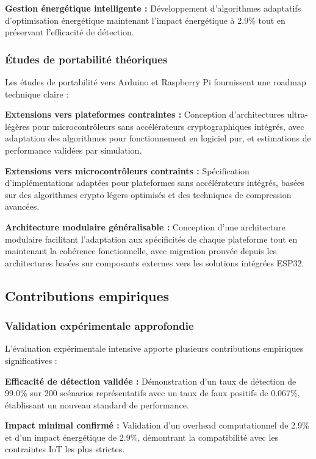 \textbf{Gestion énergétique intelligente :} Développement d'algorithmes adaptatifs d'optimisation énergétique maintenant l'impact énergétique à 2.9\% tout en préservant l'efficacité de détection.

\subsubsection{Études de portabilité théoriques}

Les études de portabilité vers Arduino et Raspberry Pi fournissent une roadmap technique claire :

\textbf{Extensions vers plateformes contraintes :} Conception d'architectures ultra-légères pour microcontrôleurs sans accélérateurs cryptographiques intégrés, avec adaptation des algorithmes pour fonctionnement en logiciel pur, et estimations de performance validées par simulation.

\textbf{Extensions vers microcontrôleurs contraints :} Spécification d'implémentations adaptées pour plateformes sans accélérateurs intégrés, basées sur des algorithmes crypto légers optimisés et des techniques de compression avancées.

\textbf{Architecture modulaire généralisable :} Conception d'une architecture modulaire facilitant l'adaptation aux spécificités de chaque plateforme tout en maintenant la cohérence fonctionnelle, avec migration prouvée depuis les architectures basées sur composants externes vers les solutions intégrées ESP32.

\subsection{Contributions empiriques}

\subsubsection{Validation expérimentale approfondie}

L'évaluation expérimentale intensive apporte plusieurs contributions empiriques significatives :

\textbf{Efficacité de détection validée :} Démonstration d'un taux de détection de 99.0\% sur 200 scénarios représentatifs avec un taux de faux positifs de 0.067\%, établissant un nouveau standard de performance.

\textbf{Impact minimal confirmé :} Validation d'un overhead computationnel de 2.9\% et d'un impact énergétique de 2.9\%, démontrant la compatibilité avec les contraintes IoT les plus strictes.

